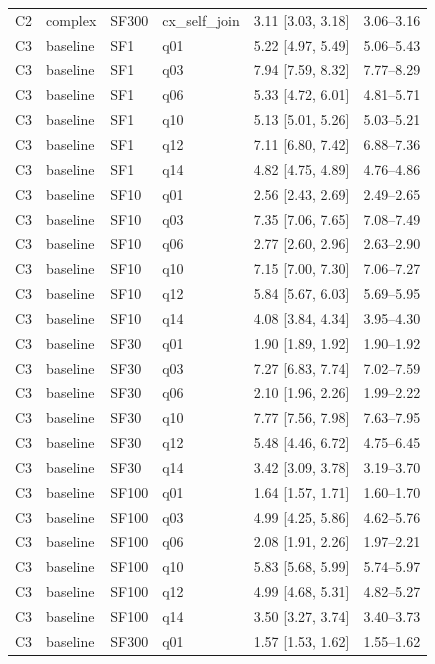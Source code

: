\begin{longtable}{lllllr}
C2 & complex & SF300 & cx\_self\_join & 3.11 [3.03, 3.18] & 3.06--3.16 \\
C3 & baseline & SF1 & q01 & 5.22 [4.97, 5.49] & 5.06--5.43 \\
C3 & baseline & SF1 & q03 & 7.94 [7.59, 8.32] & 7.77--8.29 \\
C3 & baseline & SF1 & q06 & 5.33 [4.72, 6.01] & 4.81--5.71 \\
C3 & baseline & SF1 & q10 & 5.13 [5.01, 5.26] & 5.03--5.21 \\
C3 & baseline & SF1 & q12 & 7.11 [6.80, 7.42] & 6.88--7.36 \\
C3 & baseline & SF1 & q14 & 4.82 [4.75, 4.89] & 4.76--4.86 \\
C3 & baseline & SF10 & q01 & 2.56 [2.43, 2.69] & 2.49--2.65 \\
C3 & baseline & SF10 & q03 & 7.35 [7.06, 7.65] & 7.08--7.49 \\
C3 & baseline & SF10 & q06 & 2.77 [2.60, 2.96] & 2.63--2.90 \\
C3 & baseline & SF10 & q10 & 7.15 [7.00, 7.30] & 7.06--7.27 \\
C3 & baseline & SF10 & q12 & 5.84 [5.67, 6.03] & 5.69--5.95 \\
C3 & baseline & SF10 & q14 & 4.08 [3.84, 4.34] & 3.95--4.30 \\
C3 & baseline & SF30 & q01 & 1.90 [1.89, 1.92] & 1.90--1.92 \\
C3 & baseline & SF30 & q03 & 7.27 [6.83, 7.74] & 7.02--7.59 \\
C3 & baseline & SF30 & q06 & 2.10 [1.96, 2.26] & 1.99--2.22 \\
C3 & baseline & SF30 & q10 & 7.77 [7.56, 7.98] & 7.63--7.95 \\
C3 & baseline & SF30 & q12 & 5.48 [4.46, 6.72] & 4.75--6.45 \\
C3 & baseline & SF30 & q14 & 3.42 [3.09, 3.78] & 3.19--3.70 \\
C3 & baseline & SF100 & q01 & 1.64 [1.57, 1.71] & 1.60--1.70 \\
C3 & baseline & SF100 & q03 & 4.99 [4.25, 5.86] & 4.62--5.76 \\
C3 & baseline & SF100 & q06 & 2.08 [1.91, 2.26] & 1.97--2.21 \\
C3 & baseline & SF100 & q10 & 5.83 [5.68, 5.99] & 5.74--5.97 \\
C3 & baseline & SF100 & q12 & 4.99 [4.68, 5.31] & 4.82--5.27 \\
C3 & baseline & SF100 & q14 & 3.50 [3.27, 3.74] & 3.40--3.73 \\
C3 & baseline & SF300 & q01 & 1.57 [1.53, 1.62] & 1.55--1.62 \\

\end{longtable}
